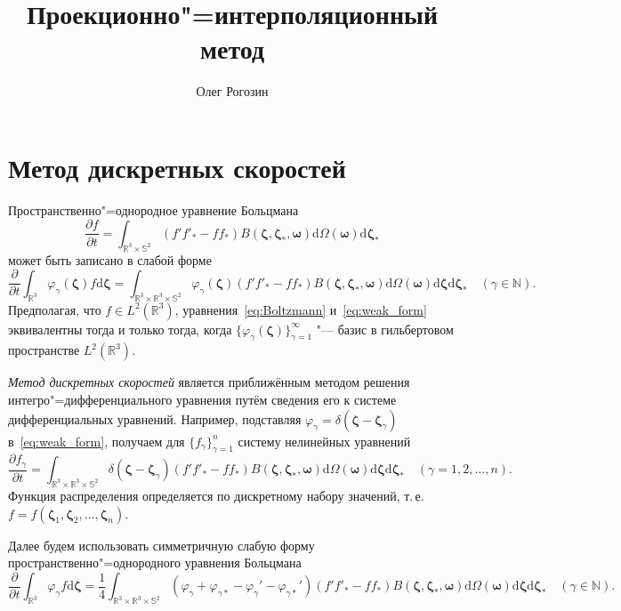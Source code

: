 \documentclass{article}
\title{Проекционно"=интерполяционный метод}
\author{Олег Рогозин}
\newcommand{\dd}{\mathrm{d}}
\newcommand{\pder}[2][]{\frac{\partial#1}{\partial#2}}
\newcommand{\dzeta}{\boldsymbol{\dd\zeta}}
\newcommand{\bzeta}{\boldsymbol{\zeta}}
\newcommand{\bomega}{\boldsymbol{\omega}}
\begin{document}
\maketitle
\tableofcontents

\section{Метод дискретных скоростей}

Пространственно"=однородное уравнение Больцмана
\begin{equation}\label{eq:Boltzmann}
    \pder[f]{t} = \int_{\mathbb{R}^3\times\mathbb{S}^2}
        (f'f'_*-ff_*)B(\bzeta,\bzeta_*,\bomega)
        \dd\Omega(\boldsymbol\omega)\dzeta_*
\end{equation}
может быть записано в слабой форме
\begin{equation}\label{eq:weak_form}
    \pder{t}\int_{\mathbb{R}^3} \varphi_\gamma(\bzeta) f\dzeta =
        \int_{\mathbb{R}^3\times\mathbb{R}^3\times\mathbb{S}^2}
        \varphi_\gamma(\bzeta) (f'f'_*-ff_*)B(\bzeta,\bzeta_*,\bomega)
        \dd\Omega(\bomega)\dzeta\dzeta_* \quad (\gamma\in\mathbb{N}).
\end{equation}
Предполагая, что \(f\in L^2(\mathbb{R}^3)\), уравнения~\eqref{eq:Boltzmann} и~\eqref{eq:weak_form} эквивалентны
тогда и только тогда, когда \(\{\varphi_\gamma(\bzeta)\}_{\gamma=1}^\infty\)
"--- базис в гильбертовом пространстве \(L^2(\mathbb{R}^3)\).

\emph{Метод дискретных скоростей} является приближённым методом решения интегро"=дифференциального уравнения
путём сведения его к системе дифференциальных уравнений.
Например, подставляя \(\varphi_\gamma = \delta(\bzeta - \bzeta_\gamma)\) в~\eqref{eq:weak_form},
получаем для \(\{f_\gamma\}_{\gamma=1}^n\) систему нелинейных уравнений
\begin{equation}\label{eq:discrete_velocities}
    \pder[f_\gamma]{t} =
        \int_{\mathbb{R}^3\times\mathbb{R}^3\times\mathbb{S}^2}
        \delta(\bzeta-\bzeta_\gamma)(f'f'_*-ff_*)B(\bzeta,\bzeta_*,\bomega)
        \dd\Omega(\bomega)\dzeta\dzeta_* \quad (\gamma=1,2,\dots,n).
\end{equation}
Функция распределения определяется по дискретному набору значений, т.\,е. \(f = f(\bzeta_1, \bzeta_2, \dots, \bzeta_n)\).

Далее будем использовать симметричную слабую форму пространственно"=однородного уравнения Больцмана
\begin{equation}\label{eq:symm_weak_form}
    \pder{t}\int_{\mathbb{R}^3} \varphi_\gamma f\dzeta =
        \frac14\int_{\mathbb{R}^3\times\mathbb{R}^3\times\mathbb{S}^2}
        \left(\varphi_\gamma+\varphi_{\gamma*}-\varphi_\gamma'-\varphi_{\gamma*}'\right)
        (f'f'_*-ff_*)B(\bzeta,\bzeta_*,\bomega)
        \dd\Omega(\bomega)\dzeta\dzeta_* \quad (\gamma\in\mathbb{N}).
\end{equation}
\end{document}
